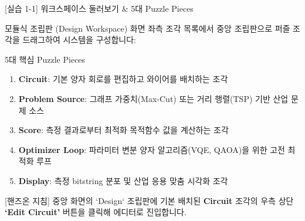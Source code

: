 \documentclass[aspectratio=169, 10pt]{beamer}
\begin{document}
\begin{frame}{[실습 1-1] 워크스페이스 둘러보기 \& 5대 Puzzle Pieces}
    \begin{qcblock}{모듈식 조립판 (Design Workspace)}
        화면 좌측 조각 목록에서 중앙 조립판으로 퍼즐 조각을 드래그하여 시스템을 구성합니다:
    \end{qcblock}
    \vspace{0.2cm}
    \begin{qcblock}{5대 핵심 Puzzle Pieces}
        \begin{enumerate}
            \item \textbf{Circuit}: 기본 양자 회로를 편집하고 와이어를 배치하는 조각
            \pause
            \item \textbf{Problem Source}: 그래프 가중치(Max-Cut) 또는 거리 행렬(TSP) 기반 산업 문제 소스
            \pause
            \item \textbf{Score}: 측정 결과로부터 최적화 목적함수 값을 계산하는 조각
            \pause
            \item \textbf{Optimizer Loop}: 파라미터 변분 양자 알고리즘(VQE, QAOA)을 위한 고전 최적화 루프
            \pause
            \item \textbf{Display}: 측정 bitstring 분포 및 산업 응용 맞춤 시각화 조각
        \end{enumerate}
    \end{qcblock}
    \vspace{0.2cm}
    \begin{qctip}{[핸즈온 지침]}
        중앙 화면의 `Design` 조립판에 기본 배치된 \textbf{Circuit} 조각의 우측 상단 \textbf{‘Edit Circuit’} 버튼을 클릭해 에디터로 진입합니다.
    \end{qctip}
\end{frame}
\end{document}
